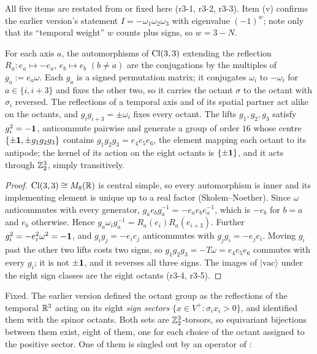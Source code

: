 All five items are restated from \cite{ES17} or fixed here (r3-1, r3-2, r3-3). Item (v) confirms the earlier version's statement
$I=-\omega_1\omega_2\omega_3$ with eigenvalue $(-1)^w$; note only that its ``temporal weight'' $w$ counts plus signs, so $w=3-N$.

\begin{proposition}
\label{r3:prop:octgroup}
For each axis $a$, the automorphisms of $\mathrm{Cl}(3,3)$ extending the reflection $R_a:e_a\mapsto-e_a$, $e_b\mapsto e_b$ $(b\neq a)$ are the
conjugations by the multiples of $g_a:=e_a\omega$. Each $g_a$ is a signed permutation matrix; it conjugates $\omega_i$ to $-\omega_i$ for
$a\in\{i,i+3\}$ and fixes the other two, so it carries the octant $\sigma$ to the octant with $\sigma_i$ reversed. The reflections of a
temporal axis and of its spatial partner act alike on the octants, and $g_ig_{i+3}=\pm\omega_i$ fixes every octant. The lifts $g_1,g_2,g_3$
satisfy $g_i^2=-\mathbf 1$, anticommute pairwise and generate a group of order $16$ whose centre $\{\pm\mathbf 1,\pm g_1g_2g_3\}$ contains
$g_1g_2g_3=e_4e_5e_6$, the element mapping each octant to its antipode; the kernel of its action on the eight octants is $\{\pm\mathbf 1\}$, and
it acts through $\mathbb{Z}_2^3$, simply transitively.
\end{proposition}

\begin{proof}
$\mathrm{Cl}(3,3)\cong M_8(\mathbb{R})$ is central simple, so every automorphism is inner and its implementing element is unique up to a real factor
(Skolem--Noether). Since $\omega$ anticommutes with every generator, $g_ae_bg_a^{-1}=-e_ae_be_a^{-1}$, which is $-e_b$ for $b=a$ and $e_b$
otherwise. Hence $g_a\omega_ig_a^{-1}=R_a(e_i)R_a(e_{i+3})$. Further $g_i^2=-e_i^2\omega^2=-\mathbf 1$, and $g_ig_j=-e_ie_j$ anticommutes with
$g_jg_i=-e_je_i$. Moving $g_i$ past the other two lifts costs two signs, so $g_1g_2g_3=-T\omega=e_4e_5e_6$ commutes with every $g_i$; it is
not $\pm\mathbf 1$, and it reverses all three signs. The images of $|\mathrm{vac}\rangle$ under the eight sign classes are the eight octants
(r3-4, r3-5).
\end{proof}

Fixed. The earlier version defined the octant group as the reflections of the temporal $\mathbb{R}^3$ acting on its eight \emph{sign sectors}
$\{x\in V^+:\sigma_ix_i>0\}$, and identified them with the spinor octants. Both sets are $\mathbb{Z}_2^3$-torsors, so equivariant bijections
between them exist, eight of them, one for each choice of the octant assigned to the positive sector. One of them is singled out by an
operator of \cite{ES17}:

